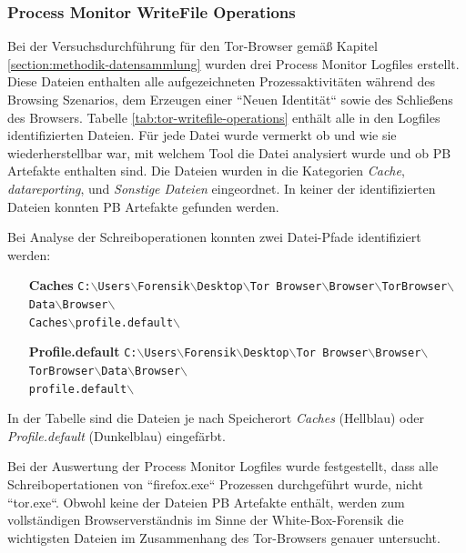 \begin{appendices}
		\subsubsection*{Process Monitor WriteFile Operations}
		\label{subsubsection:appendix-tor-common-locations-writefile-operations}
		Bei der Versuchsdurchführung für den Tor-Browser gemäß Kapitel \ref{section:methodik-datensammlung} wurden drei Process Monitor Logfiles erstellt.
		Diese Dateien enthalten alle aufgezeichneten Prozessaktivitäten während des Browsing Szenarios, dem Erzeugen einer ``Neuen Identität`` sowie des Schließens des Browsers.
		Tabelle \ref{tab:tor-writefile-operations} enthält alle in den Logfiles identifizierten Dateien.
		Für jede Datei wurde vermerkt ob und wie sie wiederherstellbar war, mit welchem Tool die Datei analysiert wurde und ob PB Artefakte enthalten sind.
		Die Dateien wurden in die Kategorien \textit{Cache}, \textit{datareporting}, und \textit{Sonstige Dateien} eingeordnet.
		In keiner der identifizierten Dateien konnten PB Artefakte gefunden werden. 
		
		Bei Analyse der Schreiboperationen konnten zwei Datei-Pfade identifiziert werden:
		\begin{itemize}
			\item[\textbf{Caches}] \texttt{C:$\backslash$Users$\backslash$Forensik$\backslash$Desktop$\backslash$Tor Browser$\backslash$Browser$\backslash$TorBrowser$\backslash$Data$\backslash$Browser$\backslash$\\Caches$\backslash$profile.default$\backslash$}
			\item[\textbf{Profile.default}] \texttt{C:$\backslash$Users$\backslash$Forensik$\backslash$Desktop$\backslash$Tor Browser$\backslash$Browser$\backslash$TorBrowser$\backslash$Data$\backslash$Browser$\backslash$\\profile.default$\backslash$}
		\end{itemize}
		In der Tabelle sind die Dateien je nach Speicherort \textit{Caches} (Hellblau) oder \textit{Profile.default} (Dunkelblau) eingefärbt. 
		
		Bei der Auswertung der Process Monitor Logfiles wurde festgestellt, dass alle Schreibopertationen von ``firefox.exe`` Prozessen durchgeführt wurde, nicht ``tor.exe``. Obwohl keine der Dateien PB Artefakte enthält, werden zum vollständigen Browserverständnis im Sinne der White-Box-Forensik die wichtigsten Dateien im Zusammenhang des Tor-Browsers genauer untersucht.
		

\end{appendices}
